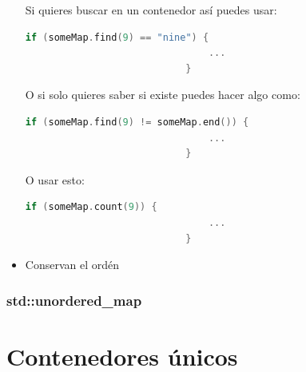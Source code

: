 \documentclass[12pt, fleqn]{report}                             %
\theoremstyle{break}                                            %
\begin{document}
\begin{itemize}
                        Si quieres buscar en un contenedor así puedes usar:
                        \begin{lstlisting}[language=C++, gobble=28]
                            if (someMap.find(9) == "nine") {   
                                ...
                            }
                        \end{lstlisting}

                        O si solo quieres saber si existe puedes hacer algo como:
                        \begin{lstlisting}[language=C++, gobble=28]
                            if (someMap.find(9) != someMap.end()) {   
                                ...
                            }
                        \end{lstlisting}

                        O usar esto:
                        \begin{lstlisting}[language=C++, gobble=28]
                            if (someMap.count(9)) {   
                                ...
                            }
                        \end{lstlisting}

                    \item 
                        Conservan el ordén
                \end{itemize}


                \subsection{std::unordered_map}
        


    \clearpage
    \chapter{Contenedores únicos}
    
\end{document}
